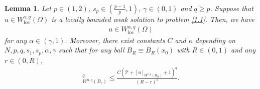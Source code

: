 \documentclass[reqno,10pt]{amsart}
\numberwithin{equation}{section}
\newtheorem{lemma}[theorem]{Lemma}
\begin{document}
\begin{lemma}\label{lem14}
	Let $p\in (1,2)$, $s_p\in \left(\frac{p-1}{p},1\right)$, $\gamma\in (0,1)$ and $q\geq p$. Suppose that $u \in W_{\mathrm{loc}}^{\gamma, q}(\Omega)$ is
	a locally bounded weak solution to problem \eqref{1.1}. Then, we have
	\begin{align*}
		u \in W_{\mathrm{loc}}^{\alpha, q}(\Omega)
	\end{align*}
	for any $\alpha\in (\gamma,1)$. Moreover, there exist constants $C$ and $\kappa$ depending on $N, p, q, s_1, s_p, \alpha, \gamma$ such that 
	for any ball $B_R \equiv B_R\left(x_0\right)$ with $R\in(0,1)$ and any $r\in (0,R)$,
	\begin{align*}
		[u]_{W^{\alpha, q}\left(B_r\right)}^q \leq \frac{C\left(\mathcal{T}+[u]_{W^{\gamma, q}\left(B_R\right)}+1\right)^q}{(R-r)^{\kappa}}.
	\end{align*}
\end{lemma}
\end{document}
